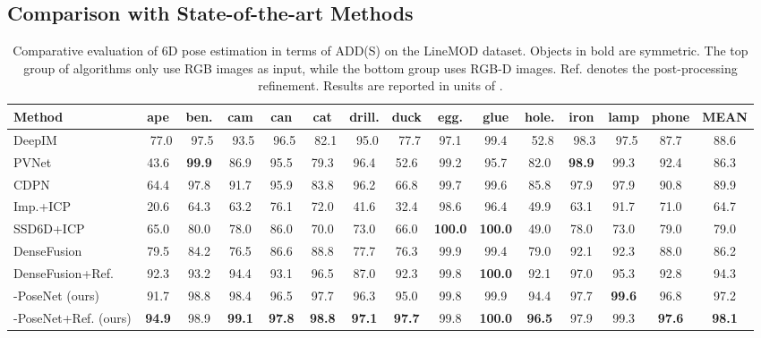 \documentclass[letterpaper, 10 pt, conference]{ieeeconf}
\begin{document}
\subsection{Comparison with State-of-the-art Methods}

\begin{table*}[t]
\begin{center}
\caption{Comparative evaluation of 6D pose estimation in terms of ADD(S) on the LineMOD dataset. Objects in bold are symmetric. The top group of algorithms only use RGB images as input, while the bottom group uses RGB-D images. Ref. denotes the post-processing refinement. Results are reported in units of .}
\resizebox{.9\textwidth}{!}
		{
\begin{tabular}{l|c|c|c|c|c|c|c|c|c|c|c|c|c|c}
\hline
Method & ape & ben. & cam & can & cat & drill. & duck & \textbf{egg.} & \textbf{glue} & hole. & iron & lamp & phone & \textbf{MEAN} \\ \hline
DeepIM \cite{li2018deepim}& ~77.0 & ~97.5 & ~93.5 & ~96.5 & ~82.1 & ~95.0 & ~77.7 & 97.1 & 99.4 & ~52.8 & ~98.3 & ~97.5 & 87.7 & 88.6 \\
PVNet \cite{peng2019pvnet} & 43.6 & \textbf{99.9} & 86.9 & 95.5 & 79.3 & 96.4 & 52.6 & 99.2 & 95.7 & 82.0 & \textbf{98.9} & 99.3 & 92.4 & 86.3 \\
CDPN \cite{li2019cdpn} & 64.4 & 97.8 & 91.7 & 95.9 & 83.8 & 96.2 & 66.8 & 99.7 & 99.6 & 85.8 & 97.9 & 97.9 & 90.8 & 89.9 \\ \hline
Imp.+ICP \cite{sundermeyer2018implicit} & 20.6 & 64.3 & 63.2 & 76.1 & 72.0 & 41.6 & 32.4 & 98.6 & 96.4 & 49.9 & 63.1 & 91.7 & 71.0 & 64.7 \\
SSD6D+ICP \cite{kehl2017ssd} & 65.0 & 80.0 & 78.0 & 86.0 & 70.0 & 73.0 & 66.0 & \textbf{100.0} & \textbf{100.0} & 49.0 & 78.0 & 73.0 & 79.0 & 79.0 \\
DenseFusion \cite{wang2019densefusion} & 79.5 & 84.2 & 76.5 & 86.6 & 88.8 & 77.7 & 76.3 & 99.9 & 99.4 & 79.0 & 92.1 & 92.3 & 88.0 & 86.2 \\
DenseFusion+Ref. \cite{wang2019densefusion} & 92.3 & 93.2 & 94.4 & 93.1 & 96.5 & 87.0 & 92.3 & 99.8 & \textbf{100.0} & 92.1 & 97.0 & 95.3 & 92.8 & 94.3 \\
-PoseNet (ours) & 91.7 & 98.8 & 98.4 & 96.5 & 97.7 & 96.3 & 95.0 & 99.8 & 99.9 & 94.4 & 97.7 & \textbf{99.6} & 96.8 & 97.2 \\
-PoseNet+Ref. (ours) & \textbf{94.9} & 98.9 & \textbf{99.1} & \textbf{97.8} & \textbf{98.8} & \textbf{97.1} & \textbf{97.7} & 99.8 & \textbf{100.0} & \textbf{96.5} & 97.9 & 99.3 & \textbf{97.6} & \textbf{98.1}\\ \hline
\end{tabular}\label{tab.limo}
}
\end{center}\vspace{-0.5cm}
\end{table*}
\end{document}
